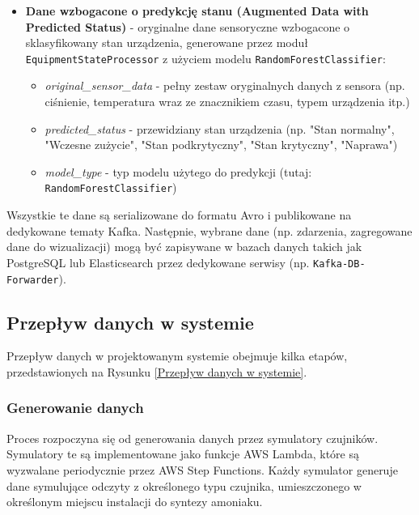 \begin{itemize}
    \item \textbf{Dane wzbogacone o predykcję stanu (Augmented Data with Predicted Status)} - oryginalne dane sensoryczne wzbogacone o sklasyfikowany stan urządzenia, generowane przez moduł \texttt{EquipmentStateProcessor} z użyciem modelu \texttt{RandomForestClassifier}:
    \begin{itemize}
        \item \textit{original_sensor_data} - pełny zestaw oryginalnych danych z sensora (np. ciśnienie, temperatura wraz ze znacznikiem czasu, typem urządzenia itp.)
        \item \textit{predicted_status} - przewidziany stan urządzenia (np. "Stan normalny", "Wczesne zużycie", "Stan podkrytyczny", "Stan krytyczny", "Naprawa")
        \item \textit{model_type} - typ modelu użytego do predykcji (tutaj: \texttt{RandomForestClassifier})
    \end{itemize}
\end{itemize}

Wszystkie te dane są serializowane do formatu Avro i publikowane na dedykowane tematy Kafka. Następnie, wybrane dane (np. zdarzenia, zagregowane dane do wizualizacji) mogą być zapisywane w bazach danych takich jak PostgreSQL lub Elasticsearch przez dedykowane serwisy (np. \texttt{Kafka-DB-Forwarder}).

\subsection{Przepływ danych w systemie}
\label{subsec:przeplyw_danych}

Przepływ danych w projektowanym systemie obejmuje kilka etapów, przedstawionych na Rysunku \ref{Przepływ danych w systemie}.


\subsubsection{Generowanie danych}
\label{subsubsec:generowanie_danych}

Proces rozpoczyna się od generowania danych przez symulatory czujników. Symulatory te są implementowane jako funkcje AWS Lambda,
które są wyzwalane periodycznie przez AWS Step Functions. Każdy symulator generuje dane symulujące odczyty z określonego typu czujnika,
umieszczonego w określonym miejscu instalacji do syntezy amoniaku.

